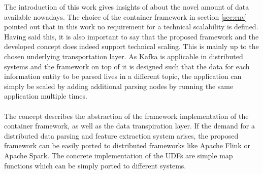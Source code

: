 The introduction of this work gives insights of about the novel amount of data available nowadays. The choice of the container framework in section \ref{sec:env} pointed out that in this work no requirement for a technical scalability is defined. Having said this, it is also important to say that the proposed framework and the developed concept does indeed support technical scaling. This is mainly up to the chosen underlying transportation layer. As Kafka is applicable in distributed systems and the framework on top of it is designed such that the data for each information entity to be parsed lives in a different topic, the application can simply be scaled by adding additional parsing nodes by running the same application multiple times.
\\\\
The concept describes the abstraction of the framework implementation of the container framework, as well as the data transpiration layer. If the demand for a distributed data parsing and feature extraction system arises, the proposed framework can be easily ported to distributed frameworks like Apache Flink or Apache Spark. The concrete implementation of the UDFs are simple map functions which can be simply ported to different systems.
